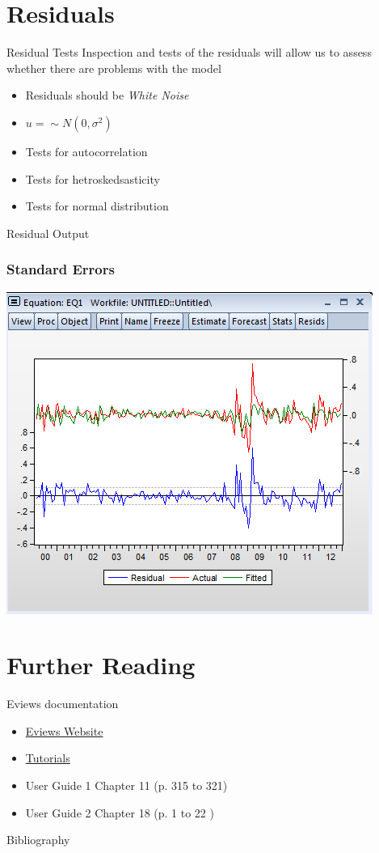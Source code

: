 \documentclass[14pt,xcolor=pdftex,dvipsnames,table]{beamer}\usepackage[]{graphicx}\usepackage[]{color}
\begin{document}
\section{Residuals}
\begin{frame}{Residual Tests}
Inspection and tests of the residuals will allow us to assess whether there are problems with the model
\begin{itemize}[<+-| alert@+>]
\item Residuals should be \emph{White Noise}
\item $u =\sim N(0, \sigma^2)$
\item Tests for autocorrelation
\item Tests for hetroskedsasticity
\item Tests for normal distribution
\end{itemize}
\end{frame}

\begin{frame}{Residual Output}
\graphicspath{{./Figures/}}
\frametitle{Standard Errors}
\begin{center}
\includegraphics[height = 3 in]{resid}
\end{center}
\end{frame}


\section{Further Reading}
\begin{frame}{Eviews documentation}
\begin{itemize}[<+-| alert@+>]
\item \href{http://www.eviews.com/home.html}{Eviews Website}
\item \href{http://www.eviews.com/Learning/index.html}{Tutorials}
\item User Guide 1 Chapter 11 (p. 315 to 321)
\item User Guide 2 Chapter 18 (p. 1 to 22 )
\end{itemize}
\end{frame}

\begin{frame}{Bibliography}

\end{frame}
\end{document}
